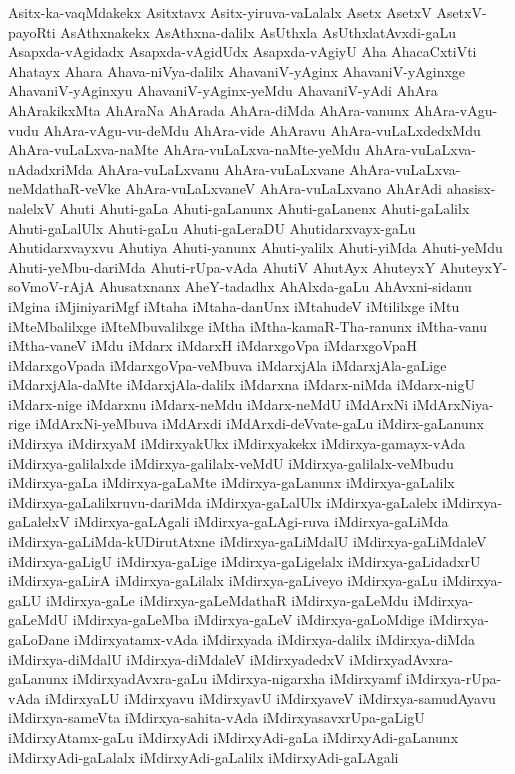 {Asitx-ka-vaqMdakekx
Asitxtavx
Asitx-yiruva-vaLalalx
Asetx
AsetxV
AsetxV-payoRti
AsAthxnakekx
AsAthxna-dalilx
AsUthxla
AsUthxlatAvxdi-gaLu
Asapxda-vAgidadx
Asapxda-vAgidUdx
Asapxda-vAgiyU
Aha
AhacaCxtiVti
Ahatayx
Ahara
Ahava-niVya-dalilx
AhavaniV-yAginx
AhavaniV-yAginxge
AhavaniV-yAginxyu
AhavaniV-yAginx-yeMdu
AhavaniV-yAdi
AhAra
AhArakikxMta
AhAraNa
AhArada
AhAra-diMda
AhAra-vanunx
AhAra-vAgu-vudu
AhAra-vAgu-vu-deMdu
AhAra-vide
AhAravu
AhAra-vuLaLxdedxMdu
AhAra-vuLaLxva-naMte
AhAra-vuLaLxva-naMte-yeMdu
AhAra-vuLaLxva-nAdadxriMda
AhAra-vuLaLxvanu
AhAra-vuLaLxvane
AhAra-vuLaLxva-neMdathaR-veVke
AhAra-vuLaLxvaneV
AhAra-vuLaLxvano
AhArAdi
ahasisx-nalelxV
Ahuti
Ahuti-gaLa
Ahuti-gaLanunx
Ahuti-gaLanenx
Ahuti-gaLalilx
Ahuti-gaLalUlx
Ahuti-gaLu
Ahuti-gaLeraDU
Ahutidarxvayx-gaLu
Ahutidarxvayxvu
Ahutiya
Ahuti-yanunx
Ahuti-yalilx
Ahuti-yiMda
Ahuti-yeMdu
Ahuti-yeMbu-dariMda
Ahuti-rUpa-vAda
AhutiV
AhutAyx
AhuteyxY
AhuteyxY-soVmoV-rAjA
Ahusatxnanx
AheY-tadadhx
AhAlxda-gaLu
AhAvxni-sidanu
iMgina
iMjiniyariMgf
iMtaha
iMtaha-danUnx
iMtahudeV
iMtililxge
iMtu
iMteMbalilxge
iMteMbuvalilxge
iMtha
iMtha-kamaR-Tha-ranunx
iMtha-vanu
iMtha-vaneV
iMdu
iMdarx
iMdarxH
iMdarxgoVpa
iMdarxgoVpaH
iMdarxgoVpada
iMdarxgoVpa-veMbuva
iMdarxjAla
iMdarxjAla-gaLige
iMdarxjAla-daMte
iMdarxjAla-dalilx
iMdarxna
iMdarx-niMda
iMdarx-nigU
iMdarx-nige
iMdarxnu
iMdarx-neMdu
iMdarx-neMdU
iMdArxNi
iMdArxNiya-rige
iMdArxNi-yeMbuva
iMdArxdi
iMdArxdi-deVvate-gaLu
iMdirx-gaLanunx
iMdirxya
iMdirxyaM
iMdirxyakUkx
iMdirxyakekx
iMdirxya-gamayx-vAda
iMdirxya-galilalxde
iMdirxya-galilalx-veMdU
iMdirxya-galilalx-veMbudu
iMdirxya-gaLa
iMdirxya-gaLaMte
iMdirxya-gaLanunx
iMdirxya-gaLalilx
iMdirxya-gaLalilxruvu-dariMda
iMdirxya-gaLalUlx
iMdirxya-gaLalelx
iMdirxya-gaLalelxV
iMdirxya-gaLAgali
iMdirxya-gaLAgi-ruva
iMdirxya-gaLiMda
iMdirxya-gaLiMda-kUDirutAtxne
iMdirxya-gaLiMdalU
iMdirxya-gaLiMdaleV
iMdirxya-gaLigU
iMdirxya-gaLige
iMdirxya-gaLigelalx
iMdirxya-gaLidadxrU
iMdirxya-gaLirA
iMdirxya-gaLilalx
iMdirxya-gaLiveyo
iMdirxya-gaLu
iMdirxya-gaLU
iMdirxya-gaLe
iMdirxya-gaLeMdathaR
iMdirxya-gaLeMdu
iMdirxya-gaLeMdU
iMdirxya-gaLeMba
iMdirxya-gaLeV
iMdirxya-gaLoMdige
iMdirxya-gaLoDane
iMdirxyatamx-vAda
iMdirxyada
iMdirxya-dalilx
iMdirxya-diMda
iMdirxya-diMdalU
iMdirxya-diMdaleV
iMdirxyadedxV
iMdirxyadAvxra-gaLanunx
iMdirxyadAvxra-gaLu
iMdirxya-nigarxha
iMdirxyamf
iMdirxya-rUpa-vAda
iMdirxyaLU
iMdirxyavu
iMdirxyavU
iMdirxyaveV
iMdirxya-samudAyavu
iMdirxya-sameVta
iMdirxya-sahita-vAda
iMdirxyasavxrUpa-gaLigU
iMdirxyAtamx-gaLu
iMdirxyAdi
iMdirxyAdi-gaLa
iMdirxyAdi-gaLanunx
iMdirxyAdi-gaLalalx
iMdirxyAdi-gaLalilx
iMdirxyAdi-gaLAgali
}
